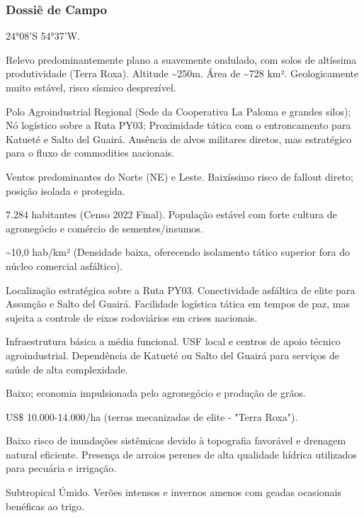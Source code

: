 \subsubsection{Dossiê de Campo}
\begin{description}[style=nextline,leftmargin=0.5cm,font=\bfseries]
\item[Coordenadas]  24°08'S 54°37'W.
\item[Topografia]  Relevo predominantemente plano a suavemente ondulado, com solos de altíssima produtividade (Terra Roxa). Altitude \textasciitilde 250m. Área de \textasciitilde 728 km². Geologicamente muito estável, risco sísmico desprezível.
\item[Alvos Estratégicos]  Polo Agroindustrial Regional (Sede da Cooperativa La Paloma e grandes silos); Nó logístico sobre a Ruta PY03; Proximidade tática com o entroncamento para Katueté e Salto del Guairá. Ausência de alvos militares diretos, mas estratégico para o fluxo de commodities nacionais.
\item[Fallout]  Ventos predominantes do Norte (NE) e Leste. Baixíssimo risco de fallout direto; posição isolada e protegida.
\item[População]  7.284 habitantes (Censo 2022 Final). População estável com forte cultura de agronegócio e comércio de sementes/\allowbreak insumos.
\item[Densidade]  \textasciitilde 10,0 hab/\allowbreak km² (Densidade baixa, oferecendo isolamento tático superior fora do núcleo comercial asfáltico).
\item[Vias de Acesso]  Localização estratégica sobre a Ruta PY03. Conectividade asfáltica de elite para Assunção e Salto del Guairá. Facilidade logística tática em tempos de paz, mas sujeita a controle de eixos rodoviários em crises nacionais.
\item[Serviços]  Infraestrutura básica a média funcional. USF local e centros de apoio técnico agroindustrial. Dependência de Katueté ou Salto del Guairá para serviços de saúde de alta complexidade.
\item[Custo de Vida]  Baixo; economia impulsionada pelo agronegócio e produção de grãos.
\item[Preço da Terra]  US\$ 10.000-14.000/\allowbreak ha (terras mecanizadas de elite - "Terra Roxa").
\item[Hidrologia]  Baixo risco de inundações sistêmicas devido à topografia favorável e drenagem natural eficiente. Presença de arroios perenes de alta qualidade hídrica utilizados para pecuária e irrigação.
\item[Clima]  Subtropical Úmido. Verões intensos e invernos amenos com geadas ocasionais benéficas ao trigo.

\end{description}
